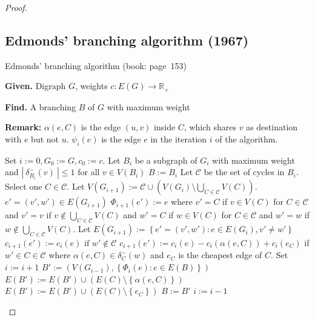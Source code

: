 \documentclass{article}
\newcommand{\card}[1]{\left|\:\!#1\:\!\right|}
\newcommand{\set}[1]{\left\{#1\right\}}
\newcommand{\given}[1]{\textbf{Given.} #1\par}
\newcommand{\find}[1]{\textbf{Find.} #1\par}
\begin{document}
\begin{proof}
\subsection[Edmonds' branching algorithm]{Edmonds' branching algorithm (1967)}
%
\begin{algorithm}
  \caption{Edmonds' branching algorithm (book: page~153)}
  \label{edmonds-branching-algo}
  \given{Digraph $G$, weights $c: E(G) \rightarrow \mathbb{R}_+$}
  \find{A branching $B$ of $G$ with maximum weight}
  \textbf{Remark:}
    $\alpha(e, C)$ is the edge $(u, v)$ inside $C$, which shares $v$ as destination with $e$ but not $u$.
    $\psi_i(e)$ is the edge $e$ in the iteration $i$ of the algorithm. \par
\begin{algorithmic}[1]
  \State Set $i := 0, G_0 := G, c_0 := c$.
  \State Let $B_i$ be a subgraph of $G_i$ with maximum weight and $\card{\delta_{B_i}^-(v)} \leq 1$ for all $v \in V(B_i)$\label{eba-step-2}
    \State $B := B_i$
  \EndIf
  \State Let $\mathcal{C}$ be the set of cycles in $B_i$. Select one $C \in \mathcal{C}$.
  \State Let $V(G_{i+1}) := \mathcal{C} \cup (V(G_i) \setminus \bigcup_{C \in \mathcal{C}} V(C))$.
    \State $e' = (v', w') \in E(G_{i+1})$
    \State $\Phi_{i+1}(e') := e$ where
    \Statex
      $v' = C$ if $v \in V(C)$ for $C \in \mathcal{C}$ and
      $v' = v$ if $v \notin \bigcup_{C \in \mathcal{C}} V(C)$ and
    \Statex
      $w' = C$ if $w \in V(C)$ for $C \in \mathcal{C}$ and
      $w' = w$ if $w \notin \bigcup_{C \in \mathcal{C}} V(C)$.
  \EndFor
  \State Let $E(G_{i+1}) := \set{e' = (v', w'): e \in E(G_i), v' \neq w'}$ 
    \State $c_{i+1}(e') := c_i(e) \text{ if } w' \notin \mathcal{C}$
    \State $c_{i+1}(e') := c_i(e) - c_i(\alpha(e, C)) + c_i(e_C)$
    \Statex
      if $w' \in C \in \mathcal{C}$ where $\alpha(e, C) \in \delta^-_C(w)$ and $e_C$ is the cheapest edge of $C$.
  \EndFor
  \State Set $i := i + 1$
    \State $B' := (V(G_{i-1}), \set{\Phi_i(e): e \in E(B)})$
        \State $E(B') := E(B') \cup (E(C) \setminus \set{\alpha(e, C)})$ 
      \Else
        \State $E(B') := E(B') \cup (E(C) \setminus \set{e_C})$ 
      \EndIf
    \EndFor
    \State $B := B'$
    \State $i := i - 1$
  \EndWhile
\end{algorithmic}
\end{algorithm}

\end{proof}
\end{document}
